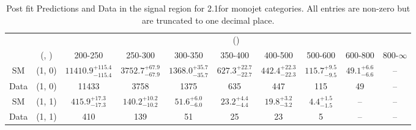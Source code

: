 \begin{table}[h!]
\tiny
\centering
\caption{Post fit Predictions and Data in the signal region for 2.1\ifb for monojet categories. All entries are non-zero but are truncated to one decimal place.\label{tab:predewkdatapost_sig_comb_mono}}
\begin{tabular}
{cccccccccc}
	\hline\hline
	&	& \multicolumn{8}{c}{\scalht (\gev)}\\ 
	&	 (\njet, \nb) & 200-250 & 250-300 & 300-350 & 350-400 & 400-500 & 500-600 & 600-800 & 800-$\infty$ \\ [0.8ex] 
\hline
	SM & (1, 0) & $11410.9^{+ 115.4 }_{- 115.4 }$ & $3752.7^{+ 67.9 }_{- 67.9 }$ & $1368.0^{+ 35.7 }_{- 35.7 }$ & $627.3^{+ 22.7 }_{- 22.7 }$ & $442.4^{+ 22.3 }_{- 22.3 }$ & $115.7^{+ 9.5 }_{- 9.5 }$ & $49.1^{+ 6.6 }_{- 6.6 }$ & -- \\[0.5ex] 
	Data & (1, 0) & 11433 & 3758 & 1375 & 635 & 447 & 115 & 49 & -- \\[0.5ex] 
	SM & (1, 1) & $415.9^{+ 17.3 }_{- 17.3 }$ & $140.2^{+ 10.2 }_{- 10.2 }$ & $51.6^{+ 6.0 }_{- 6.0 }$ & $23.2^{+ 4.4 }_{- 4.4 }$ & $19.8^{+ 3.2 }_{- 3.2 }$ & $4.4^{+ 1.5 }_{- 1.5 }$ & -- & -- \\[0.5ex] 
	Data & (1, 1) & 410 & 139 & 51 & 25 & 23 & 5 & -- & -- \\[0.5ex] 
	\hline
	\hline
\end{tabular}
\end{table}
